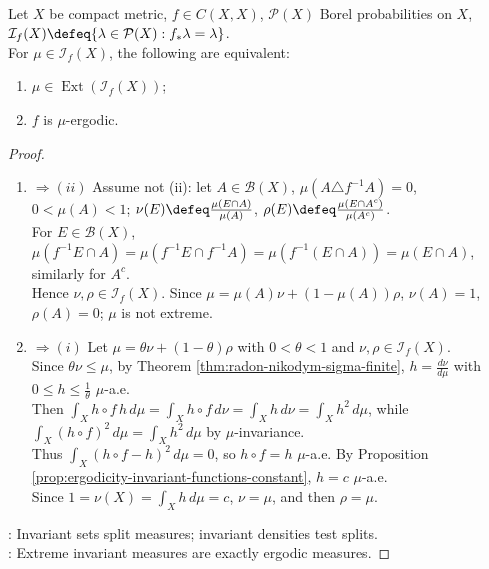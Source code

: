 \begin{proposition} \label{prop:ergodic-measures-extreme-invariant-measures} \\
Let $X$ be compact metric, $f\in C(X,X)$, $\mathcal{P}(X)$ Borel probabilities on $X$, $\mathcal{I}_f(X)\defeq\{\lambda\in\mathcal{P}(X):f_*\lambda=\lambda\}$.\\
For $\mu\in\mathcal{I}_f(X)$, the following are equivalent:
\begin{enumerate}[label=(\roman*)]
\setlength{\itemsep}{0pt}
\item $\mu\in\operatorname{Ext}(\mathcal{I}_f(X))$;
\item $f$ is $\mu$-ergodic.
\end{enumerate}
\begin{proof}
\begin{enumerate}[label=(\roman*)]
\setlength{\itemsep}{0pt}
\item[$(i)$]$\Rightarrow (ii)$ Assume not (ii): let $A\in\mathcal{B}(X)$, $\mu(A\triangle f^{-1}A)=0$, $0<\mu(A)<1$; $\nu(E)\defeq\frac{\mu(E\cap A)}{\mu(A)}$, $\rho(E)\defeq\frac{\mu(E\cap A^c)}{\mu(A^c)}$.\\
For $E\in\mathcal{B}(X)$, $\mu(f^{-1}E\cap A)=\mu(f^{-1}E\cap f^{-1}A)=\mu(f^{-1}(E\cap A))=\mu(E\cap A)$, similarly for $A^c$.\\
Hence $\nu,\rho\in\mathcal{I}_f(X)$. Since $\mu=\mu(A)\nu+(1-\mu(A))\rho$, $\nu(A)=1$, $\rho(A)=0$; $\mu$ is not extreme.
\item[$(ii)$]$\Rightarrow (i)$ Let $\mu=\theta\nu+(1-\theta)\rho$ with $0<\theta<1$ and $\nu,\rho\in\mathcal{I}_f(X)$.\\
Since $\theta\nu\leq\mu$, by Theorem \ref{thm:radon-nikodym-sigma-finite}, $h=\frac{d\nu}{d\mu}$ with $0\leq h\leq\frac1\theta$ $\mu$-a.e.\\
Then $\int_X h\circ f\,h\,d\mu=\int_X h\circ f\,d\nu=\int_X h\,d\nu=\int_X h^2\,d\mu$, while $\int_X(h\circ f)^2\,d\mu=\int_Xh^2\,d\mu$ by $\mu$-invariance.\\
Thus $\int_X(h\circ f-h)^2\,d\mu=0$, so $h\circ f=h$ $\mu$-a.e. By Proposition \ref{prop:ergodicity-invariant-functions-constant}, $h=c$ $\mu$-a.e.\\
Since $1=\nu(X)=\int_Xh\,d\mu=c$, $\nu=\mu$, and then $\rho=\mu$.
\end{enumerate}
: Invariant sets split measures; invariant densities test splits.\\
: Extreme invariant measures are exactly ergodic measures.
\end{proof}
\end{proposition}

